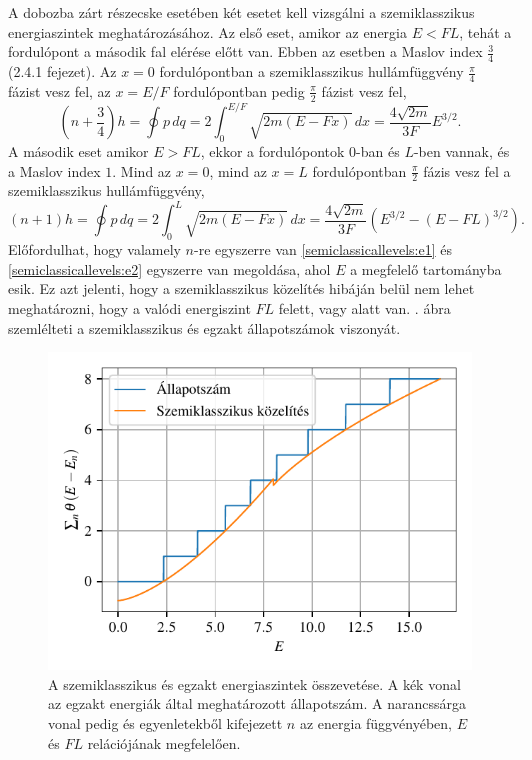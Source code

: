 A dobozba zárt részecske esetében két esetet kell vizsgálni a szemiklasszikus energiaszintek meghatározásához. Az első eset, amikor az energia $E < FL$, tehát a fordulópont a második fal elérése előtt van. Ebben az esetben a Maslov index $\frac{3}{4}$ \cite{brack:semiclassical} (2.4.1 fejezet). Az $x=0$ fordulópontban a szemiklasszikus hullámfüggvény $\frac{\pi}{4}$ fázist vesz fel, az $x=E/F$ fordulópontban pedig $\frac{\pi}{2}$ fázist vesz fel,
\begin{equation}
	\left(n+\frac{3}{4}\right)h=\oint p\,dq=2\int_0^{E/F}\sqrt{2m\left( E-Fx \right)}\,dx=\frac{4\sqrt{2m}}{3F}E^{3/2}.
	\label{semiclassicallevels:e1}
\end{equation}
A második eset amikor $E > FL$, ekkor a fordulópontok $0$-ban és $L$-ben vannak, és a Maslov index $1$. Mind az $x=0$, mind az $x=L$ fordulópontban $\frac{\pi}{2}$ fázis vesz fel a szemiklasszikus hullámfüggvény,
\begin{equation}
	\left(n+1\right)h=\oint p\,dq=2\int_0^{L}\sqrt{2m\left(E-Fx\right)}\,dx=\frac{4\sqrt{2m}}{3F}\left(E^{3/2}-\left(E-FL\right)^{3/2}\right).
	\label{semiclassicallevels:e2}
\end{equation}
Előfordulhat, hogy valamely $n$-re egyszerre van \eqref{semiclassicallevels:e1} és \eqref{semiclassicallevels:e2} egyszerre van megoldása, ahol $E$ a megfelelő tartományba esik. Ez azt jelenti, hogy a szemiklasszikus közelítés hibáján belül nem lehet meghatározni, hogy a valódi energiszint $FL$ felett, vagy alatt van. . ábra szemlélteti a szemiklasszikus és egzakt állapotszámok viszonyát.
\begin{figure}[H]
	\centering
	\includegraphics[scale=1]{./figs/allapotszam.pdf}
	\caption[Szemiklasszikus állapotszám]{A szemiklasszikus és egzakt energiaszintek összevetése. A kék vonal az egzakt energiák által meghatározott állapotszám. A narancssárga vonal pedig  és  egyenletekből kifejezett $n$ az energia függvényében, $E$ és $FL$ relációjának megfelelően.}
	\label{semiclassicallevels:allapotszam}
\end{figure}